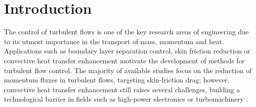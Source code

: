 


%
\section{Introduction}\label{s:intro}
%
The control of turbulent flows is one of the key research areas of engineering due to its utmost importance in the transport of mass, momentum and heat. Applications such as boundary layer separation control, skin friction reduction or convective heat transfer enhancement motivate the development of methods for turbulent flow control. The majority of available studies focus on the reduction of momentum fluxes in turbulent flows, targeting skin-friction drag; however, convective heat transfer enhancement still raises several challenges, building a technological barrier in fields such as high-power electronics or turbomachinery \citep[see e.g.][]{moore2014emerging,han2012gas}. 

